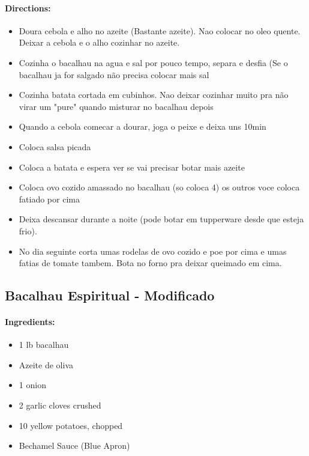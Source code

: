 \documentclass{article}
\begin{document}
\paragraph{Directions:}
\begin{itemize}
    \item Doura cebola e alho no azeite (Bastante azeite). Nao colocar no oleo quente. Deixar a cebola e o alho cozinhar no azeite.
    \item Cozinha o bacalhau na agua e sal por pouco tempo, separa e desfia (Se o bacalhau ja for salgado não precisa colocar mais sal
    \item Cozinha batata cortada em cubinhos. Nao deixar cozinhar muito pra não virar um "pure" quando misturar no bacalhau depois
    \item Quando a cebola comecar a dourar, joga o peixe e deixa uns 10min
    \item Coloca salsa picada
    \item Coloca a batata e espera ver se vai precisar botar mais azeite
    \item Coloca ovo cozido amassado no bacalhau (so coloca 4) os outros voce coloca fatiado por cima
    \item Deixa descansar durante a noite (pode botar em tupperware desde que esteja frio).
    \item No dia seguinte corta umas rodelas de ovo cozido e poe por cima e umas fatias de tomate tambem. Bota no forno pra deixar  queimado em cima.
\end{itemize}

\subsection{Bacalhau Espiritual - Modificado}

\paragraph{Ingredients:}
\begin{itemize}
    \item 1 lb bacalhau
    \item Azeite de oliva
    \item 1 onion
    \item 2 garlic cloves crushed
    \item 10 yellow potatoes, chopped
    \item Bechamel Sauce (Blue Apron)
\end{itemize}
\end{document}
